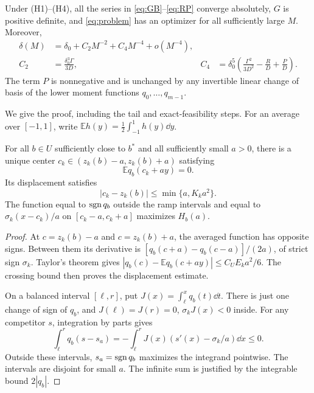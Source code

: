 \begin{theorem}\label{thm:infinite}
Under {\rm(H1)--(H4)}, all the series in \eqref{eq:GB}--\eqref{eq:RP}
converge absolutely, \(G\) is positive definite, and \eqref{eq:problem}
has an optimizer for all sufficiently large \(M\). Moreover,
\begin{align}
 \delta(M)&=\delta_0+C_2M^{-2}+C_4M^{-4}+o(M^{-4}),\label{eq:expansion}\\
 C_2&=\frac{\delta_0^3\Gamma}{3D},&
 C_4&=\delta_0^5\left(\frac{\Gamma^2}{3D^2}-\frac{R}{D}
                          +\frac{P}{D}\right).\label{eq:coefficients}
\end{align}
The term \(P\) is nonnegative and is unchanged by any invertible linear
change of basis of the lower moment functions \(q_0,\ldots,q_{m-1}\).
\end{theorem}

We give the proof, including the tail and exact-feasibility steps.
For an average over \([-1,1]\), write
\(\mathbb E h(y)=\frac12\int_{-1}^1h(y)\dd y\).

\begin{lemma}\label{lem:ramps}
For all \(b\in U\) sufficiently close to \(b^*\) and all sufficiently small
\(a>0\), there is a unique center \(c_k\in(z_k(b)-a,z_k(b)+a)\) satisfying
\begin{equation}\label{eq:balance}
 \mathbb E q_b(c_k+ay)=0.
\end{equation}
Its displacement satisfies
\[
 |c_k-z_k(b)|\leq\min\{a,K_ka^2\}.
\]
The function equal to \(\operatorname{sgn} q_b\) outside the ramp intervals and equal
to \(\sigma_k(x-c_k)/a\) on \([c_k-a,c_k+a]\) maximizes \(H_b(a)\).
\end{lemma}
\begin{proof}
At \(c=z_k(b)-a\) and \(c=z_k(b)+a\), the averaged function has opposite
signs. Between them its derivative is
\([q_b(c+a)-q_b(c-a)]/(2a)\), of strict sign \(\sigma_k\).
Taylor's theorem gives
\(|q_b(c)-\mathbb E q_b(c+ay)|\leq C_UE_ka^2/6\).
The crossing bound then proves the displacement estimate.

On a balanced interval \([\ell,r]\), put
\(J(x)=\int_\ell^xq_b(t)\dd t\).
There is just one change of sign of \(q_b\), and
\(J(\ell)=J(r)=0\), \(\sigma_kJ(x)<0\) inside.
For any competitor \(s\), integration by parts gives
\[
 \int_\ell^rq_b(s-s_a)
   =-\int_\ell^rJ(x)(s'(x)-\sigma_k/a)\dd x\leq0.
\]
Outside these intervals, \(s_a=\operatorname{sgn} q_b\) maximizes the integrand
pointwise. The intervals are disjoint for small \(a\).
The infinite sum is justified by the integrable bound \(2|q_b|\).
\end{proof}

